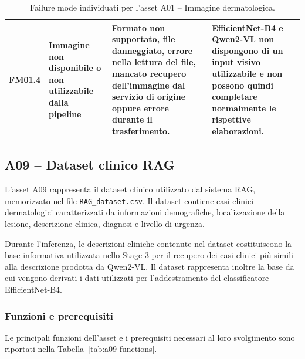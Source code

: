 \begin{table}[H]
\begin{tabularx}{\textwidth}{
        >{\raggedright\arraybackslash}p{1.1cm}
        >{\raggedright\arraybackslash}p{3cm}
        >{\raggedright\arraybackslash}p{5cm}
        X
    }
        \midrule

        FM01.4 &
        Immagine non disponibile o non utilizzabile dalla pipeline &
        Formato non supportato, file danneggiato, errore nella lettura del file,
        mancato recupero dell'immagine dal servizio di origine oppure errore
        durante il trasferimento. &
        EfficientNet-B4 e Qwen2-VL non dispongono di un input visivo utilizzabile
        e non possono quindi completare normalmente le rispettive elaborazioni. \\

        \bottomrule
    \end{tabularx}

    \caption{Failure mode individuati per l'asset A01 -- Immagine dermatologica.}
    \label{tab:a01-failure-modes}
\end{table}
\subsection{A09 -- Dataset clinico RAG}

L'asset A09 rappresenta il dataset clinico utilizzato dal sistema RAG,
memorizzato nel file \texttt{RAG\_dataset.csv}. Il dataset contiene casi
clinici dermatologici caratterizzati da informazioni demografiche,
localizzazione della lesione, descrizione clinica, diagnosi e livello
di urgenza.

Durante l'inferenza, le descrizioni cliniche contenute nel dataset
costituiscono la base informativa utilizzata nello Stage 3 per il recupero
dei casi clinici più simili alla descrizione prodotta da Qwen2-VL.
Il dataset rappresenta inoltre la base da cui vengono derivati i dati
utilizzati per l'addestramento del classificatore EfficientNet-B4.


\subsubsection{Funzioni e prerequisiti}

Le principali funzioni dell'asset e i prerequisiti necessari al loro
svolgimento sono riportati nella Tabella~\ref{tab:a09-functions}.

